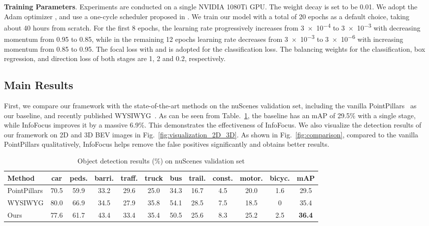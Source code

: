 \documentclass[runningheads]{llncs}
\begin{document}
\noindent\textbf{Training Parameters}.
Experiments are conducted on a single NVIDIA 1080Ti GPU. The weight decay is set to be 0.01. We adopt the Adam optimizer \cite{kingma2014adam}, and use a one-cycle scheduler proposed in \cite{smith2018disciplined}. We train our model with a total of 20 epochs as a default choice, taking about 40 hours from scratch. For the first 8 epochs, the learning rate progressively increases from \num{3e-4} to \num{3e-3} with decreasing momentum from 0.95 to 0.85, while in the remaining 12 epochs learning rate decreases from \num{3e-3} to \num{3e-6} with increasing momentum from 0.85 to 0.95. The focal loss \cite{lin2017focal} with  and   is adopted for the classification loss. The balancing weights for the classification, box regression, and direction loss  of both stages are 1, 2 and 0.2, respectively.

\subsection{Main Results}
 First, we compare our framework with the state-of-the-art methods on the nuScenes validation set, including the vanilla PointPillars~\cite{lang2019PointPillars} as our baseline, and recently published WYSIWYG~\cite{hu2019you}. As can be seen from Table.~\ref{table:1}, the baseline has an mAP of 29.5\% with a single stage, while InfoFocus improves it by a massive 6.9\%. This demonstrates the effectiveness of InfoFocus. We also visualize the detection results of our framework on 2D and 3D BEV images in Fig.~\ref{fig:visualization_2D_3D}. As shown in Fig.~\ref{fig:comparison}, compared to the vanilla PointPillars qualitatively, InfoFocus helps remove the false positives significantly and obtains better results. 
 
  \begin{table}[h!]
\centering
\caption{Object detection results (\%) on nuScenes validation set}
\begin{tabular}{l c c c c c c c c c c c} 
 \hline
 Method & car & peds. & barri. & traff. & truck & bus & trail. & const. & motor. & bicyc. & mAP \\ [0.5ex] 
 \hline
  PointPillars \cite{lang2019PointPillars} & 70.5 & 59.9 & 33.2 & 29.6 & 25.0 & 34.3 & 16.7 & 4.5 & 20.0 & 1.6 & 29.5 \\

    WYSIWYG \cite{hu2019you} & 80.0 & 66.9 & 34.5 & 27.9 & 35.8 & 54.1 & 28.5 & 7.5 & 18.5 & 0 & 35.4 \\
  \hline
  Ours & 77.6 & 61.7 & 43.4 & 33.4 & 35.4 & 50.5 & 25.6 & 8.3 & 25.2 & 2.5 & \bf 36.4 \\
\hline
\end{tabular}
\label{table:1}
\end{table}
\end{document}
